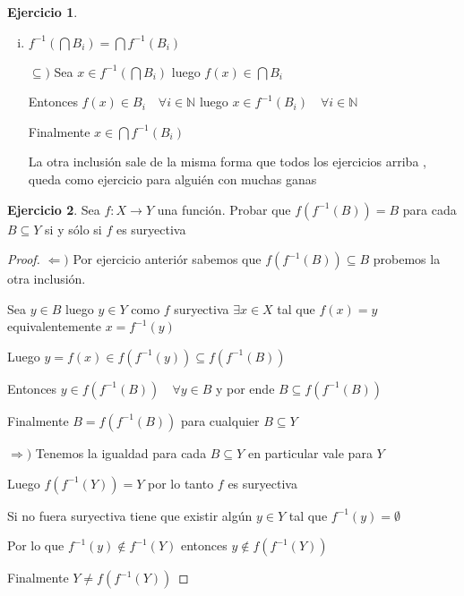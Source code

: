 \documentclass[12pt]{article}
\newcommand{\N}{\mathbb{N}}
\newcommand{\Ra}{\Rightarrow}
\newcommand{\ra}{\rightarrow}
\theoremstyle{definition}
\newtheorem{ej}{Ejercicio}
\begin{document}
\begin{ej}
\begin{enumerate}[i.]
\begin{proof}
      Por ende $x \in f^{-1}(f(x)) \subseteq f^{-1}(B_{j}) \subseteq \bigcup f^{-1}(B_{i})$

      Finalmente $x \in \bigcup f^{-1}(B_{i})$

      $\supseteq )$ Por hipótesis sabemos $\exists j \in \N$ tal que $x \in f^{-1}(B_{j})$

      Por lo que $f(x) \in B_{j}$ y entonces $f(x) \in \bigcup B_{j}$

      Luego $x \in f^{-1} (\bigcup B_{j})$
    \end{proof}
  \item $f^{-1}(\bigcap B_{i}) = \bigcap f^{-1}(B_{i})$

    $\subseteq )$ Sea $x \in f^{-1}(\bigcap B_{i})$ luego $f(x) \in \bigcap B_{i}$

    Entonces $f(x) \in B_{i} \quad \forall i \in \N$ luego $x \in f^{-1}(B_{i}) \quad \forall i \in \N$

    Finalmente $x \in \bigcap f^{-1}(B_{i})$

    La otra inclusión sale de la misma forma que todos los ejercicios arriba , queda como ejercicio para alguién con muchas ganas

\end{enumerate}
\end{ej}

\begin{ej}
Sea $f: X \ra Y$ una función. Probar que $f(f^{-1}(B)) = B$ para cada $B \subseteq Y$ si y sólo si $f$ es suryectiva

\begin{proof}
 $\Leftarrow)$ Por ejercicio anteriór sabemos que $f(f^{-1}(B)) \subseteq B $ probemos la otra inclusión.

  Sea $y \in B$ luego $y \in Y$ como $f$ suryectiva $\exists x \in X$ tal que $f(x) = y$ equivalentemente $x = f^{-1}(y)$

  Luego $y = f(x) \in f(f^{-1}(y)) \subseteq f(f^{-1}(B)) $

  Entonces $y \in f(f^{-1}(B)) \quad \forall y \in B $ y por ende $B \subseteq f(f^{-1}(B))$ 

  Finalmente $B = f(f^{-1}(B)) $ para cualquier $B \subseteq Y$

  $\Ra )$ Tenemos la igualdad para cada $B \subseteq Y$ en particular vale para $Y$ 

  Luego $f(f^{-1}(Y)) = Y$ por lo tanto $f$ es suryectiva 

  Si no fuera suryectiva tiene que existir algún $y \in Y$ tal que $f^{-1}(y) = \emptyset$ 

  Por lo que $f^{-1}(y) \notin f^{-1}(Y)$ entonces $y \notin f(f^{-1}(Y))$

  Finalmente $Y \neq f(f^{-1}(Y))$
\end{proof}
\end{ej}
\noindent
\end{document}

